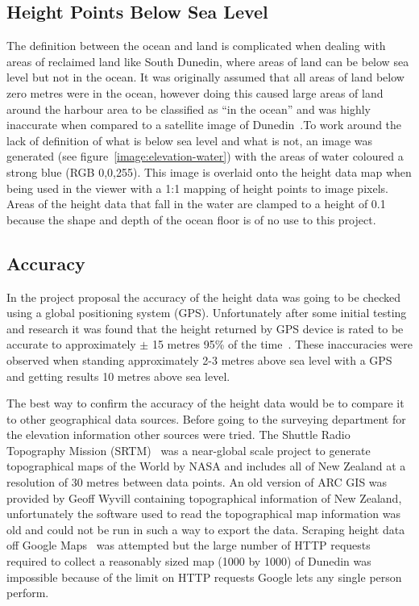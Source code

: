 \documentclass[12pt]{report}
\newcommand{\note}[1]{}
\newcommand{\notedme}[1]{}
\begin{document}
\subsection{Height Points Below Sea Level}
The definition between the ocean and land is complicated when dealing with areas of reclaimed land like South Dunedin, where areas of land can be below sea level but not in the ocean. It was originally assumed that all areas of land below zero metres were in the ocean, however doing this caused large areas of land around the harbour area to be classified as ``in the ocean'' and was highly inaccurate when compared to a satellite image of Dunedin~\cite{gmaps}.To work around the lack of definition of what is below sea level and what is not, an image was generated (see figure~\ref{image:elevation-water}) with the areas of water coloured a strong blue (RGB 0,0,255). This image is overlaid onto the height data map when being used in the viewer with a 1:1 mapping of height points to image pixels. Areas of the height data that fall in the water are clamped to a height of 0.1 because the shape and depth of the ocean floor is of no use to this project.

\subsection{Accuracy}
In the project proposal the accuracy of the height data was going to be checked using a global positioning system (GPS). Unfortunately after some initial testing and research it was found that the height returned by GPS device is rated to be accurate to approximately $\pm$ 15 metres 95\% of the time~\cite{gpsaltitude}. These inaccuracies were observed when standing approximately 2-3 metres above sea level \note{on a beach don't think I need to say this}\notedme{what about tides?}\note{the tide was 3/4 high}\notedme{don't tell me, tell the report! ;-) I'm not sure what the tide difference is to sea-level, or how sea-level is defined. Might be good to mention it.} with a GPS and getting results 10 metres above sea level.

The best way to confirm the accuracy of the height data would be to compare it to other geographical data sources. Before going to the surveying department for the elevation information other sources were tried. The Shuttle Radio Topography Mission (SRTM)~\cite{srtm} was a near-global scale project to generate topographical maps of the World by NASA and includes all of New Zealand at a resolution of 30 metres between data points. An old version of ARC GIS was provided by Geoff Wyvill containing topographical information of New Zealand, unfortunately the software used to read the topographical map information was old and could not be run in such a way to export the data. Scraping height data off Google Maps~\cite{gmaps} was attempted but the large number of HTTP requests required to collect a reasonably sized map (1000 by 1000) of Dunedin was impossible because of the limit on HTTP requests Google lets any single person perform.
\end{document}
